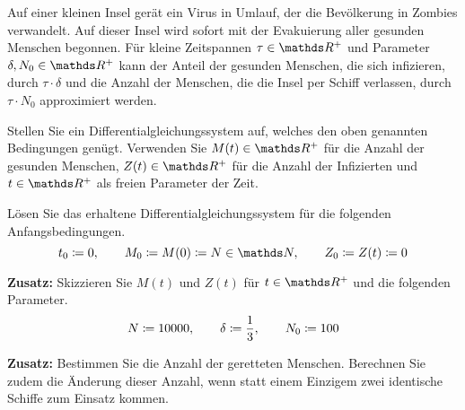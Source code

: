 \begin{atiTask}[
	title = Ein Ausweg aus der Zombieapokalypse
]
	Auf einer kleinen Insel gerät ein Virus in Umlauf, der die Bevölkerung in Zombies verwandelt.
	Auf dieser Insel wird sofort mit der Evakuierung aller gesunden Menschen begonnen.
	Für kleine  Zeitspannen $\tau\in\setR^+$ und Parameter $\delta,N_0\in\setR^+$ kann der Anteil der gesunden Menschen, die sich infizieren, durch $\tau\cdot\delta$ und die Anzahl der Menschen, die die Insel per Schiff verlassen, durch $\tau\cdot N_0$ approximiert werden.
	\begin{atiSubtasks}
		\item{
			Stellen Sie ein Differentialgleichungssystem auf, welches den oben genannten Bedingungen genügt.
			Verwenden Sie $M(t)\in\setR^+$ für die Anzahl der gesunden Menschen, $Z(t)\in\setR^+$ für die Anzahl der Infizierten und $t\in\setR^+$ als freien Parameter der Zeit.

		}
		\item{
			Lösen Sie das erhaltene Differentialgleichungssystem für die folgenden Anfangsbedingungen.
			\[
				t_0 \define 0 \separate M_0\define M(0)\define N\in\setN \separate Z_0\define Z(t) \define 0
			\]
		}
		\item{
			\textbf{Zusatz:} Skizzieren Sie $M(t)$ und $Z(t)$ für $t\in\setR^+$ und die folgenden Parameter.
			\[
				N \coloneqq 10000,\qquad \delta \coloneqq \frac{1}{3} ,\qquad N_0 \coloneqq 100
			\]
		}
		\item{
			\textbf{Zusatz:}
			Bestimmen Sie die Anzahl der geretteten Menschen.
			Berechnen Sie zudem die Änderung dieser Anzahl, wenn statt einem Einzigem zwei identische Schiffe zum Einsatz kommen.
		}
	\end{atiSubtasks}
\end{atiTask}